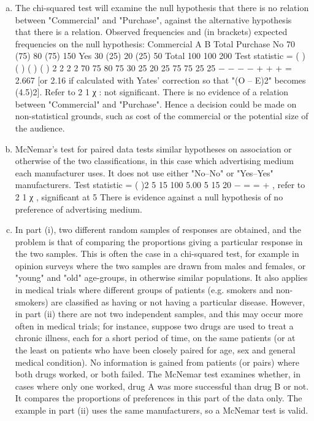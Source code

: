 \documentclass[a4paper,12pt]{article}
\begin{document}
\begin{enumerate}[(a)]
\item The chi-squared test will examine the null hypothesis that there is no relation
between "Commercial" and "Purchase", against the alternative hypothesis that
there is a relation.
Observed frequencies and (in brackets) expected frequencies on the null
hypothesis:
Commercial
A B Total
Purchase No 70 (75) 80 (75) 150 Yes 30 (25) 20 (25) 50
Total 100 100 200
Test statistic = ( ) ( ) ( ) ( ) 2 2 2 2 70 75 80 75 30 25 20 25
75 75 25 25
− − − −
+ + + = 2.667
[or 2.16 if calculated with Yates' correction so that "(O – E)2" becomes (4.5)2].
Refer to 2
1 χ : not significant. There is no evidence of a relation between
"Commercial" and "Purchase".
Hence a decision could be made on non-statistical grounds, such as cost of the
commercial or the potential size of the audience.
\item  McNemar's test for paired data tests similar hypotheses on association or
otherwise of the two classifications, in this case which advertising medium
each manufacturer uses. It does not use either "No–No" or "Yes–Yes"
manufacturers.
Test statistic = ( )2 5 15 100 5.00
5 15 20
−
= =
+
, refer to 2
1 χ , significant at 5%
There is evidence against a null hypothesis of no preference of advertising
medium.
\item In part (i), two different random samples of responses are obtained, and the
problem is that of comparing the proportions giving a particular response in
the two samples. This is often the case in a chi-squared test, for example in
opinion surveys where the two samples are drawn from males and females, or
"young" and "old" age-groups, in otherwise similar populations. It also
applies in medical trials where different groups of patients (e.g. smokers and
non-smokers) are classified as having or not having a particular disease.
However, in part (ii) there are not two independent samples, and this may
occur more often in medical trials; for instance, suppose two drugs are used to
treat a chronic illness, each for a short period of time, on the same patients (or
at the least on patients who have been closely paired for age, sex and general
medical condition). No information is gained from patients (or pairs) where
both drugs worked, or both failed. The McNemar test examines whether, in
cases where only one worked, drug A was more successful than drug B or not.
It compares the proportions of preferences in this part of the data only. The
example in part (ii) uses the same manufacturers, so a McNemar test is valid.
\end{enumerate}
\end{document}
